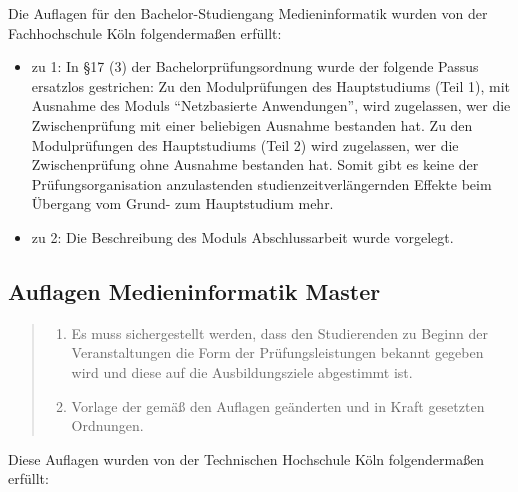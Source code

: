 Die Auflagen für den Bachelor-Studiengang Medieninformatik wurden von
der Fachhochschule Köln folgendermaßen erfüllt:

\begin{itemize}
\tightlist
\item
  zu 1: In §17 (3) der Bachelorprüfungsordnung wurde der folgende Passus
  ersatzlos gestrichen: Zu den Modulprüfungen des Hauptstudiums (Teil
  1), mit Ausnahme des Moduls ``Netzbasierte Anwendungen'', wird
  zugelassen, wer die Zwischenprüfung mit einer beliebigen Ausnahme
  bestanden hat. Zu den Modulprüfungen des Hauptstudiums (Teil 2) wird
  zugelassen, wer die Zwischenprüfung ohne Ausnahme bestanden hat. Somit
  gibt es keine der Prüfungsorganisation anzulastenden
  studienzeitverlängernden Effekte beim Übergang vom Grund- zum
  Hauptstudium mehr.
\item
  zu 2: Die Beschreibung des Moduls Abschlussarbeit wurde vorgelegt.
\end{itemize}

\subsection{Auflagen Medieninformatik
Master}\label{auflagen-medieninformatik-master}

\begin{quote}
\begin{enumerate}
\def\labelenumi{\arabic{enumi}.}
\tightlist
\item
  Es muss sichergestellt werden, dass den Studierenden zu Beginn der
  Veranstaltungen die Form der Prüfungsleistungen bekannt gegeben wird
  und diese auf die Ausbildungsziele abgestimmt ist.
\item
  Vorlage der gemäß den Auflagen geänderten und in Kraft gesetzten
  Ordnungen.
\end{enumerate}
\end{quote}

Diese Auflagen wurden von der Technischen Hochschule Köln folgendermaßen
erfüllt:

